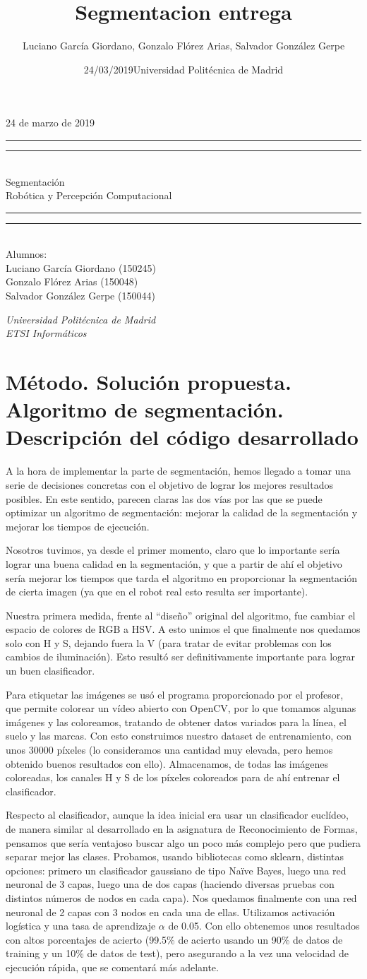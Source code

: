 \documentclass{article}
\title{Segmentacion entrega}
\author{Luciano García Giordano, Gonzalo Flórez Arias, Salvador González Gerpe}
\date{24/03/2019}
\date{Universidad Politécnica de Madrid}
\newcommand*{\frontPageEC}[2]{
    \begingroup %
        \centering %
        \vspace*{\baselineskip} %
        {\begin{flushright} \LARGE #1  \end{flushright}}
        \vspace*{\baselineskip}
        \rule{\textwidth}{1.6pt}\vspace*{-\baselineskip}\vspace*{2pt} %
        \rule{\textwidth}{0.4pt}\\[\baselineskip] %
        {\LARGE #2  \\[0.8\baselineskip] \large{Robótica y Percepción Computacional}}\\[0.2\baselineskip] %
        \rule{\textwidth}{0.4pt}\vspace*{-\baselineskip}\vspace{3.2pt} %
        \rule{\textwidth}{1.6pt}\\[\baselineskip] %
        \vspace*{2\baselineskip} %
        Alumnos: \\[\baselineskip]
        {\Large Luciano García Giordano (150245)} \\
        {\Large Gonzalo Flórez Arias (150048)} \\
        {\Large Salvador González Gerpe (150044)} \\
        
        \vfill
        
        {\itshape Universidad Politécnica de Madrid \\ ETSI Informáticos\par} %
    \endgroup}
\begin{document}
\frontPageEC{24 de marzo de 2019}{Segmentación}
\thispagestyle{empty}

\newpage
\tableofcontents
\setcounter{page}{1}

\clearpage
\newpage

\section{Método. Solución propuesta. Algoritmo de segmentación. Descripción del código desarrollado}

	A la hora de implementar la parte de segmentación, hemos llegado a tomar una serie de decisiones concretas con el objetivo de lograr los mejores resultados posibles. En este sentido, parecen claras las dos vías por las que se puede optimizar un algoritmo de segmentación: mejorar la calidad de la segmentación y mejorar los tiempos de ejecución.

	Nosotros tuvimos, ya desde el primer momento, claro que lo importante sería lograr una buena calidad en la segmentación, y que a partir de ahí el objetivo sería mejorar los tiempos que tarda el algoritmo en proporcionar la segmentación de cierta imagen (ya que en el robot real esto resulta ser importante). 

	Nuestra primera medida, frente al “diseño” original del algoritmo, fue cambiar el espacio de colores de RGB a HSV. A esto unimos el que finalmente nos quedamos solo con H y S, dejando fuera la V (para tratar de evitar problemas con los cambios de iluminación). Esto resultó ser definitivamente importante para lograr un buen clasificador.

	Para etiquetar las imágenes se usó el programa proporcionado por el profesor, que permite colorear un vídeo abierto con OpenCV, por lo que tomamos algunas imágenes y las coloreamos, tratando de obtener datos variados para la línea, el suelo y las marcas. Con esto construimos nuestro dataset de entrenamiento, con unos 30000 píxeles (lo consideramos una cantidad muy elevada, pero hemos obtenido buenos resultados con ello). Almacenamos, de todas las imágenes coloreadas, los canales H y S de los píxeles coloreados para de ahí entrenar el clasificador.

	Respecto al clasificador, aunque la idea inicial era usar un clasificador euclídeo, de manera similar al desarrollado en la asignatura de Reconocimiento de Formas, pensamos que sería ventajoso buscar algo un poco más complejo pero que pudiera separar mejor las clases. Probamos, usando bibliotecas como sklearn, distintas opciones: primero un clasificador gaussiano de tipo Naïve Bayes, luego una red neuronal de 3 capas, luego una de dos capas (haciendo diversas pruebas con distintos números de nodos en cada capa). Nos quedamos finalmente con una red neuronal de 2 capas con 3 nodos en cada una de ellas. Utilizamos activación logística y una tasa de aprendizaje $\alpha$ de 0.05. Con ello obtenemos unos resultados con altos porcentajes de acierto (99.5\% de acierto usando un 90\% de datos de training y un 10\% de datos de test), pero asegurando a la vez una velocidad de ejecución rápida, que se comentará más adelante.
\end{document}
